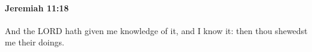 
		\paragraph{Jeremiah 11:18} %
			\label{JEREMIAH-11-18}

			And the LORD hath given me knowledge of it, and I know it: then thou shewedst me their doings.


